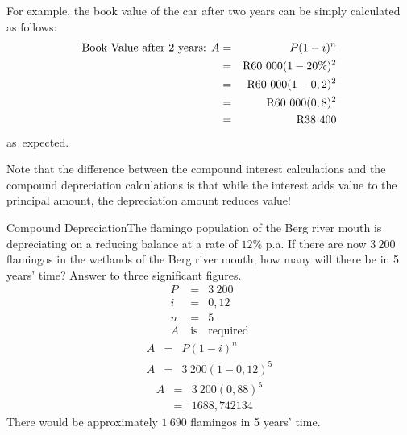 For example, the book value of the car after two years can be simply calculated as follows:
\begin{eqnarray*}
\mbox{Book Value after 2 years: } A &=& P(1-i)^n\\
&=&\rm{R}60~000(1-20\%)^2\\
&=&\rm{R}60~000(1-0,2)^2\\
&=&\rm{R}60~000(0,8)^2\\
&=&\rm{R}38~400
\end{eqnarray*}
\mbox{as expected.}

Note that the difference between the compound interest calculations and the compound depreciation calculations is that while the interest adds value to the principal amount, the depreciation amount reduces value!
\clearpage

\begin{wex}{Compound Depreciation}{The flamingo population of the Berg river mouth is depreciating on a reducing balance at a rate of $12\%$ p.a. If there are now $3~200$ flamingos in the wetlands of the Berg river mouth, how many will there be in 5 years' time? Answer to three significant figures.}{
\begin{eqnarray*}
P &=& 3~200\\
i &=& 0,12\\
n &=& 5\\
A~ &\mbox{is}& \mbox{required}
\end{eqnarray*}
\begin{eqnarray*}
A &=& P(1 - i)^n\\
A &=& 3~200(1-0,12)^5
\end{eqnarray*}
\begin{eqnarray*}
A &=& 3~200(0,88)^5\\
&=& 1688,742134
\end{eqnarray*}
There would be approximately $1~690$ flamingos in 5 years' time.
}
\end{wex}

